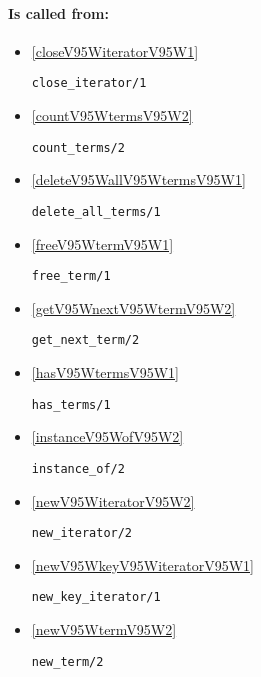 \paragraph{Is called from:} 
\begin{itemize}
\item \ref{closeV95WiteratorV95W1} 
\begin{verbatim}
close_iterator/1
\end{verbatim}

\item \ref{countV95WtermsV95W2} 
\begin{verbatim}
count_terms/2
\end{verbatim}

\item \ref{deleteV95WallV95WtermsV95W1} 
\begin{verbatim}
delete_all_terms/1
\end{verbatim}

\item \ref{freeV95WtermV95W1} 
\begin{verbatim}
free_term/1
\end{verbatim}

\item \ref{getV95WnextV95WtermV95W2} 
\begin{verbatim}
get_next_term/2
\end{verbatim}

\item \ref{hasV95WtermsV95W1} 
\begin{verbatim}
has_terms/1
\end{verbatim}

\item \ref{instanceV95WofV95W2} 
\begin{verbatim}
instance_of/2
\end{verbatim}

\item \ref{newV95WiteratorV95W2} 
\begin{verbatim}
new_iterator/2
\end{verbatim}

\item \ref{newV95WkeyV95WiteratorV95W1} 
\begin{verbatim}
new_key_iterator/1
\end{verbatim}

\item \ref{newV95WtermV95W2} 
\begin{verbatim}
new_term/2
\end{verbatim}


\end{itemize}
